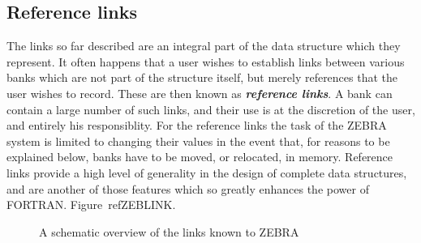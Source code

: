 \subsection{Reference links}
\par The links so far described are an integral part of the data structure
which they represent. It often happens that a user wishes to establish
links between various banks which are not part of the structure itself,
but merely references that the user wishes to record.
These are then known as
{\bf\it reference links}. A bank can contain a large number of such links,
and their use is at the discretion of the user, and entirely his
responsiblity. For the reference links the task of
the ZEBRA system is limited to changing their
values in the event that, for reasons to be explained
below, banks have to be moved, or relocated, in memory. Reference links
provide a high level of generality in the design of complete data
structures, and are another of those features which so greatly
enhances the power of FORTRAN.
Figure~ref{ZEBLINK}.
\begin{figure}%
\caption{A schematic overview of the links known to ZEBRA}
\label{ZEBLINK}
\end{figure}
